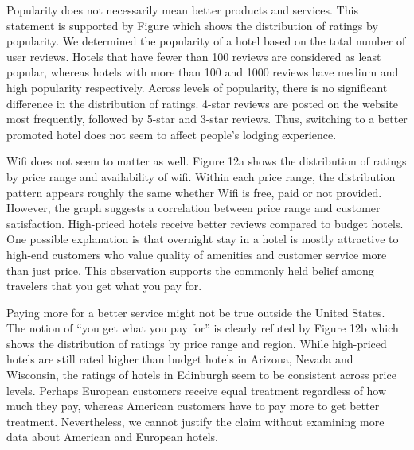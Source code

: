 \documentclass[11pt]{article}
\begin{document}
Popularity does not necessarily mean better products and services. This statement is supported by Figure which shows the distribution of ratings by popularity. We determined the popularity of a hotel based on the total number of user reviews. Hotels that have fewer than 100 reviews are considered as least popular, whereas hotels with more than 100 and 1000 reviews have medium and high popularity respectively. Across levels of popularity, there is no significant difference in the distribution of ratings. 4-star reviews are posted on the website most frequently, followed by 5-star and 3-star reviews. Thus, switching to a better promoted hotel does not seem to affect people’s lodging experience.

Wifi does not seem to matter as well. Figure 12a shows the distribution of ratings by price range and availability of wifi. Within each price range, the distribution pattern appears roughly the same whether Wifi is free, paid or not provided. However, the graph suggests a correlation between price range and customer satisfaction. High-priced hotels receive better reviews compared to budget hotels. One possible explanation is that overnight stay in a hotel is mostly attractive to high-end customers who value quality of amenities and customer service more than just price. This observation supports the commonly held belief among travelers that you get what you pay for.

Paying more for a better service might not be true outside the United States. The notion of “you get what you pay for” is clearly refuted by Figure 12b which shows the distribution of ratings by price range and region. While high-priced hotels are still rated higher than budget hotels in Arizona, Nevada and Wisconsin, the ratings of hotels in Edinburgh seem to be consistent across price levels. Perhaps European customers receive equal treatment regardless of how much they pay, whereas American customers have to pay more to get better treatment. Nevertheless, we cannot justify the claim without examining more data about American and European hotels.
\end{document}
